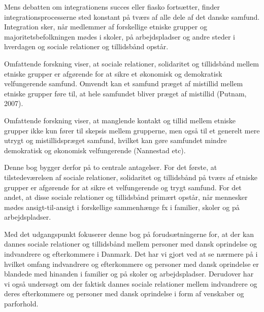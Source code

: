 \documentclass[
]{book}
\begin{document}
Mens debatten om integrationens succes eller fiasko fortsætter, finder integrationsprocesserne sted konstant på tværs af alle dele af det danske samfund. Integration sker, når medlemmer af forskellige etniske grupper og majoritetsbefolkningen mødes i skoler, på arbejdspladser og andre steder i hverdagen og sociale relationer og tillidsbånd opstår.

Omfattende forskning viser, at sociale relationer, solidaritet og tillidsbånd mellem etniske grupper er afgørende for at sikre et økonomisk og demokratisk velfungerende samfund. Omvendt kan et samfund præget af mistillid mellem etniske grupper føre til, at hele samfundet bliver præget af mistillid (Putnam, 2007).

Omfattende forskning viser, at manglende kontakt og tillid mellem etniske grupper ikke kun fører til skepsis mellem grupperne, men også til et generelt mere utrygt og mistillidspræget samfund, hvilket kan gøre samfundet mindre demokratisk og økonomisk velfungerende (Nannestad etc).

Denne bog bygger derfor på to centrale antagelser. For det første, at tilstedeværelsen af sociale relationer, solidaritet og tillidsbånd på tværs af etniske grupper er afgørende for at sikre et velfungerende og trygt samfund. For det andet, at disse sociale relationer og tillidsbånd primært opstår, når mennesker mødes ansigt-til-ansigt i forskellige sammenhænge fx i familier, skoler og på arbejdspladser.

Med det udgangspunkt fokuserer denne bog på forudsætningerne for, at der kan dannes sociale relationer og tillidsbånd mellem personer med dansk oprindelse og indvandrere og efterkommere i Danmark. Det har vi gjort ved at se nærmere på i hvilket omfang indvandrere og efterkommere og personer med dansk oprindelse er blandede med hinanden i familier og på skoler og arbejdspladser. Derudover har vi også undersøgt om der faktisk dannes sociale relationer mellem indvandrere og deres efterkommere og personer med dansk oprindelse i form af venskaber og parforhold.
\end{document}
